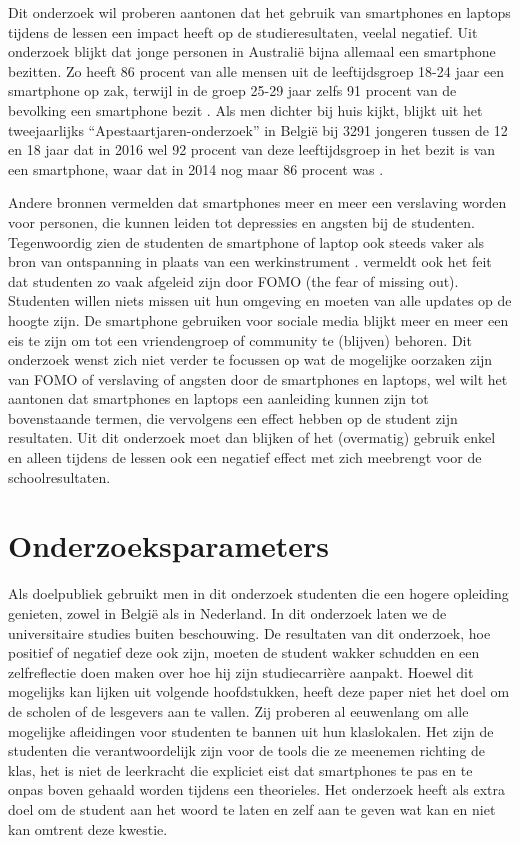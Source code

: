 Dit onderzoek wil proberen aantonen dat het gebruik van smartphones en laptops tijdens de lessen een impact heeft op de studieresultaten, veelal negatief. Uit onderzoek blijkt dat jonge personen in Australië bijna allemaal een smartphone bezitten. Zo heeft 86 procent van alle mensen uit de leeftijdsgroep 18-24 jaar een smartphone op zak, terwijl in de groep 25-29 jaar zelfs 91 procent van de bevolking een smartphone bezit \autocite{Farley2015}. Als men dichter bij huis kijkt, blijkt uit het tweejaarlijks “Apestaartjaren-onderzoek” in België bij 3291 jongeren tussen de 12 en 18 jaar dat in 2016 wel 92 procent van deze leeftijdsgroep in het bezit is van een smartphone, waar dat in 2014 nog maar 86 procent was \autocite{Apestaartjaren2016}.

Andere bronnen \autocite{MatarBoumosleh2017} vermelden dat smartphones meer en meer een verslaving worden voor personen, die kunnen leiden tot depressies en angsten bij de studenten. Tegenwoordig zien de studenten de smartphone of laptop ook steeds vaker als bron van ontspanning in plaats van een werkinstrument \autocite{Baert2018}. \textcite{Baert2018} vermeldt ook het feit dat studenten zo vaak afgeleid zijn door FOMO (the fear of missing out). Studenten willen niets missen uit hun omgeving en moeten van alle updates op de hoogte zijn. De smartphone gebruiken voor sociale media blijkt meer en meer een eis te zijn om tot een vriendengroep of community te (blijven) behoren. Dit onderzoek wenst zich niet verder te focussen op wat de mogelijke oorzaken zijn van FOMO of verslaving of angsten door de smartphones en laptops, wel wilt het aantonen dat smartphones en laptops een aanleiding kunnen zijn tot bovenstaande termen, die vervolgens een effect hebben op de student zijn resultaten. Uit dit onderzoek moet dan blijken of het (overmatig) gebruik enkel en alleen tijdens de lessen ook een negatief effect met zich meebrengt voor de schoolresultaten.

\section{Onderzoeksparameters}
\label{sec:onderzoeksparameters}

Als doelpubliek gebruikt men in dit onderzoek studenten die een hogere opleiding genieten, zowel in België als in Nederland. In dit onderzoek laten we de universitaire studies buiten beschouwing. De resultaten van dit onderzoek, hoe positief of negatief deze ook zijn, moeten de student wakker schudden en een zelfreflectie doen maken over hoe hij zijn studiecarrière aanpakt. Hoewel dit mogelijks kan lijken uit volgende hoofdstukken, heeft deze paper niet het doel om de scholen of de lesgevers aan te vallen. Zij proberen al eeuwenlang om alle mogelijke afleidingen voor studenten te bannen uit hun klaslokalen. Het zijn de studenten die verantwoordelijk zijn voor de tools die ze meenemen richting de klas, het is niet de leerkracht die expliciet eist dat smartphones te pas en te onpas boven gehaald worden tijdens een theorieles. Het onderzoek heeft als extra doel om de student aan het woord te laten en zelf aan te geven wat kan en niet kan omtrent deze kwestie.

